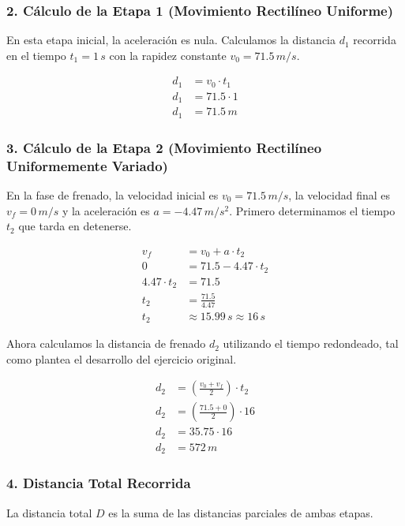 \documentclass[12pt, a4paper]{article}
\begin{document}
\subsubsection*{2. Cálculo de la Etapa 1 (Movimiento Rectilíneo Uniforme)}
En esta etapa inicial, la aceleración es nula. Calculamos la distancia $d_1$ recorrida en el tiempo $t_1 = 1 \, \si{s}$ con la rapidez constante $v_0 = 71.5 \, \si{m/s}$.

\begin{align*}
d_1 &= v_0 \cdot t_1 \\
d_1 &= 71.5 \cdot 1 \\
d_1 &= 71.5 \, \si{m}
\end{align*}

\subsubsection*{3. Cálculo de la Etapa 2 (Movimiento Rectilíneo Uniformemente Variado)}
En la fase de frenado, la velocidad inicial es $v_0 = 71.5 \, \si{m/s}$, la velocidad final es $v_f = 0 \, \si{m/s}$ y la aceleración es $a = -4.47 \, \si{m/s^2}$. Primero determinamos el tiempo $t_2$ que tarda en detenerse.

\begin{align*}
v_f &= v_0 + a \cdot t_2 \\
0 &= 71.5 - 4.47 \cdot t_2 \\
4.47 \cdot t_2 &= 71.5 \\
t_2 &= \frac{71.5}{4.47} \\
t_2 &\approx 15.99 \, \si{s} \approx 16 \, \si{s}
\end{align*}

Ahora calculamos la distancia de frenado $d_2$ utilizando el tiempo redondeado, tal como plantea el desarrollo del ejercicio original.

\begin{align*}
d_2 &= \left( \frac{v_0 + v_f}{2} \right) \cdot t_2 \\
d_2 &= \left( \frac{71.5 + 0}{2} \right) \cdot 16 \\
d_2 &= 35.75 \cdot 16 \\
d_2 &= 572 \, \si{m}
\end{align*}

\subsubsection*{4. Distancia Total Recorrida}
La distancia total $D$ es la suma de las distancias parciales de ambas etapas.
\end{document}
